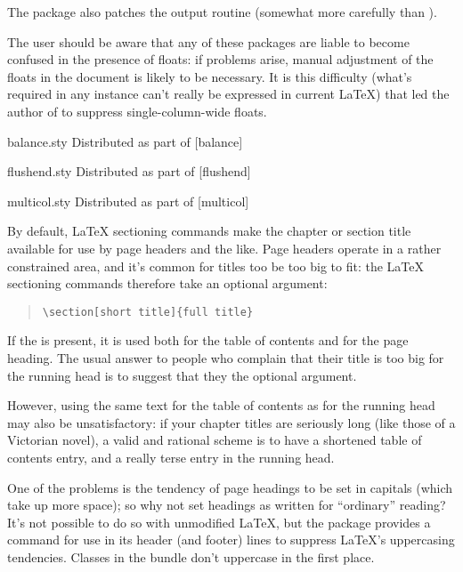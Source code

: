 The  package also patches the output routine
(somewhat more carefully than ).

The user should be aware that any of these packages are liable to
become confused in the presence of floats: if problems arise, manual
adjustment of the floats in the document is likely to be necessary.
It is this difficulty (what's required in any instance can't really be
expressed in current \LaTeX{}) that led the author of
 to suppress single-column-wide floats.
\begin{ctanrefs}
\item[balance.sty]Distributed as part of [balance]
\item[flushend.sty]Distributed as part of [flushend]
\item[multicol.sty]Distributed as part of [multicol]

\end{ctanrefs}


By default, \LaTeX{} sectioning commands make the chapter or section
title available for use by page headers and the like.  Page headers
operate in a rather constrained area, and it's common for titles too
be too big to fit: the \LaTeX{} sectioning commands therefore take an
optional argument:
\begin{quote}
\begin{verbatim}
\section[short title]{full title}
\end{verbatim}
\end{quote}
If the  is present, it is used both for the table of
contents and for the page heading.  The usual answer to people who
complain that their title is too big for the running head is to
suggest that they the optional argument.

However, using the same text for the table of contents as for the
running head may also be unsatisfactory: if your chapter titles are
seriously long (like those of a Victorian novel), a valid and rational
scheme is to have a shortened table of contents entry, and a really
terse entry in the running head.

One of the problems is the tendency of page headings to be set in
capitals (which take up more space); so why not set headings as written
for ``ordinary'' reading?  It's not possible to do so with unmodified
\LaTeX{}, but the  package provides a command
 for use in its header (and footer) lines to suppress
\LaTeX{}'s uppercasing tendencies.  Classes in the 
bundle don't uppercase in the first place.

